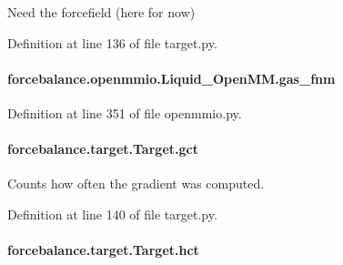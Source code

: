 Need the forcefield (here for now) 



Definition at line 136 of file target.\-py.

\hypertarget{classforcebalance_1_1openmmio_1_1Liquid__OpenMM_a7b835f5dbacf1c31ead8c0c47e6895ce}{
\paragraph[{gas\-\_\-fnm}]{\setlength{\rightskip}{0pt plus 5cm}forcebalance.\-openmmio.\-Liquid\-\_\-\-Open\-M\-M.\-gas\-\_\-fnm}}\label{classforcebalance_1_1openmmio_1_1Liquid__OpenMM_a7b835f5dbacf1c31ead8c0c47e6895ce}


Definition at line 351 of file openmmio.\-py.

\hypertarget{classforcebalance_1_1target_1_1Target_aa625ac88c6744eb14ef281d9496d0dbb}{
\paragraph[{gct}]{\setlength{\rightskip}{0pt plus 5cm}forcebalance.\-target.\-Target.\-gct\hspace{0.3cm}{\ttfamily [inherited]}}}\label{classforcebalance_1_1target_1_1Target_aa625ac88c6744eb14ef281d9496d0dbb}


Counts how often the gradient was computed. 



Definition at line 140 of file target.\-py.

\hypertarget{classforcebalance_1_1target_1_1Target_a5b5a42f78052b47f29ed4b940c6111a1}{
\paragraph[{hct}]{\setlength{\rightskip}{0pt plus 5cm}forcebalance.\-target.\-Target.\-hct\hspace{0.3cm}{\ttfamily [inherited]}}}\label{classforcebalance_1_1target_1_1Target_a5b5a42f78052b47f29ed4b940c6111a1}


